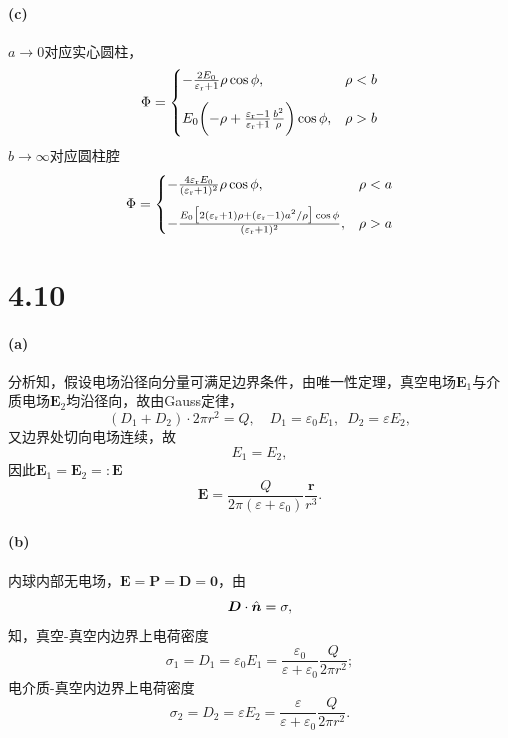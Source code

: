 \paragraph{(c)}
$a\to0$对应实心圆柱，
\begin{equation}
    \Phi=\begin{cases}
        -\frac{2E_0}{\varepsilon_\text r+1}\rho\cos\phi,&\rho<b\\[2ex]
        E_0\biggl(-\rho+\frac{\varepsilon_\text r-1}{\varepsilon_\text r+1}\frac{b^2}\rho\biggr)\cos\phi,&\rho>b
    \end{cases}
\end{equation}
$b\to\infty$对应圆柱腔
\begin{equation}
    \Phi=\begin{cases}
        -\frac{4\varepsilon_\text r E_0}{(\varepsilon_\text r+1)^2}\rho\cos\phi,&\rho<a\\[2ex]
        -\frac{E_0\bigl[2(\varepsilon_\text r+1)\rho+(\varepsilon_\text r-1)a^2/\rho\bigr]\cos\phi}{(\varepsilon_\text r+1)^2},&\rho>a
    \end{cases}
\end{equation}
\setcounter{section}{2}
\section*{4.10}
\paragraph{(a)}
分析知，假设电场沿径向分量可满足边界条件，由唯一性定理，真空电场$\bm E_1$与介质电场$\bm E_2$均沿径向，故由Gauss定律，
\begin{equation}
    (D_1+D_2)\cdot 2\pi r^2=Q,\quad D_1=\varepsilon_0E_1,\enspace D_2=\varepsilon E_2,
\end{equation}
又边界处切向电场连续，故
\begin{equation}
    E_1=E_2,
\end{equation}
因此$\bm E_1=\bm E_2=:\bm E$
\begin{equation}
    \bm E=\frac{Q}{2\pi(\varepsilon+\varepsilon_0)}\frac{\bm r}{r^3}.
\end{equation}
\paragraph{(b)}
内球内部无电场，$\bm E=\bm P=\bm D=\bm 0$，由
\begin{equation}
    \bm D\cdot\mathop{}\!\hat{\bm n}=\sigma,
\end{equation}
知，真空-真空内边界上电荷密度
\begin{equation}
    \sigma_1=D_1=\varepsilon_0E_1=\frac{\varepsilon_0}{\varepsilon+\varepsilon_0}\frac Q{2\pi r^2};
\end{equation}
电介质-真空内边界上电荷密度 
\begin{equation}
    \sigma_2=D_2=\varepsilon E_2=\frac\varepsilon{\varepsilon+\varepsilon_0}\frac Q{2\pi r^2}.
\end{equation}
